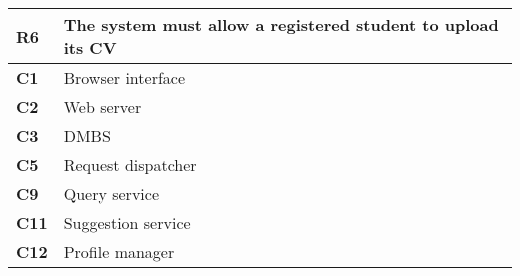 \begin{table}[H]
    \centering
    \begin{tabular}{|l|m{10cm}|}
        \hline \textbf{R6} & The system must allow a registered student to upload its CV \\
        \hline \textbf{C1} & Browser interface \\
        \hline \textbf{C2} & Web server \\
        \hline \textbf{C3} & DMBS \\
        \hline \textbf{C5} & Request dispatcher \\
        \hline \textbf{C9} & Query service \\
        \hline \textbf{C11} & Suggestion service \\
        \hline \textbf{C12} & Profile manager \\
        \hline
    \end{tabular}
\end{table}

